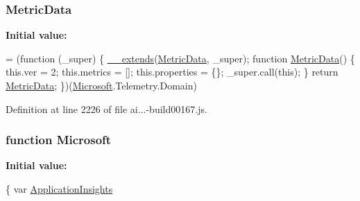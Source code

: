 \subsubsection[{\texorpdfstring{Metric\+Data}{MetricData}}]{ Metric\+Data}\hypertarget{_scripts_2ai_80_822_89-build00167_8js_a2dc65d060c9e53677015ff1e51b99976}{}\label{_scripts_2ai_80_822_89-build00167_8js_a2dc65d060c9e53677015ff1e51b99976}
{\bfseries Initial value\+:}
\begin{DoxyCode}
= (\textcolor{keyword}{function} (\_super) \{
        \hyperlink{obj_2_release_2_package_2_package_tmp_2_scripts_2ai_80_822_89-build00167_8js_ac09f4951ac4b25df0272d4e78ff85ae0}{\_\_extends}(\hyperlink{obj_2_release_2_package_2_package_tmp_2_scripts_2ai_80_822_89-build00167_8js_a2dc65d060c9e53677015ff1e51b99976}{MetricData}, \_super);
        \textcolor{keyword}{function} \hyperlink{obj_2_release_2_package_2_package_tmp_2_scripts_2ai_80_822_89-build00167_8js_a2dc65d060c9e53677015ff1e51b99976}{MetricData}() \{
            this.ver = 2;
            this.metrics = [];
            this.properties = \{\};
            \_super.call(\textcolor{keyword}{this});
        \}
        \textcolor{keywordflow}{return} \hyperlink{obj_2_release_2_package_2_package_tmp_2_scripts_2ai_80_822_89-build00167_8js_a2dc65d060c9e53677015ff1e51b99976}{MetricData};
    \})(\hyperlink{obj_2_release_2_package_2_package_tmp_2_scripts_2ai_80_822_89-build00167_8js_af7b21097393c8dc2ece8949358ff0e27}{Microsoft}.Telemetry.Domain)
\end{DoxyCode}


Definition at line 2226 of file ai...-\/build00167.\+js.

\subsubsection[{\texorpdfstring{Microsoft}{Microsoft}}]{\setlength{\rightskip}{0pt plus 5cm}function Microsoft}\hypertarget{_scripts_2ai_80_822_89-build00167_8js_a346f48e65cfff7589049e855265d5054}{}\label{_scripts_2ai_80_822_89-build00167_8js_a346f48e65cfff7589049e855265d5054}
{\bfseries Initial value\+:}
\begin{DoxyCode}
\{
    var \hyperlink{obj_2_release_2_package_2_package_tmp_2_scripts_2ai_80_822_89-build00167_8js_aa415ef4f8cdd699689ef4b61db7656d8}{ApplicationInsights}
\end{DoxyCode}


